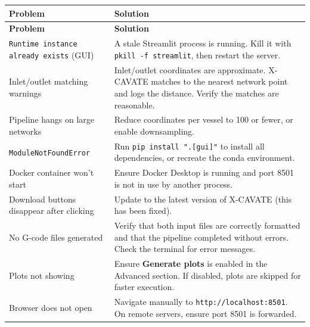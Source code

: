 \documentclass[11pt,letterpaper]{article}
\newcommand{\code}[1]{\texttt{#1}}
\newcommand{\gui}[1]{\textcolor{guicolor}{\textsf{\textbf{#1}}}}
\begin{document}
\begin{longtable}{L{4.5cm} X}
\toprule
\textbf{Problem} & \textbf{Solution} \\
\midrule
\endfirsthead
\toprule
\textbf{Problem} & \textbf{Solution} \\
\midrule
\endhead
\code{Runtime instance already exists} (GUI) &
A stale Streamlit process is running. Kill it with \code{pkill -f streamlit}, then restart the server. \\
\midrule
Inlet/outlet matching warnings &
Inlet/outlet coordinates are approximate. X-CAVATE matches to the nearest network point and logs the distance. Verify the matches are reasonable. \\
\midrule
Pipeline hangs on large networks &
Reduce coordinates per vessel to 100 or fewer, or enable downsampling. \\
\midrule
\code{ModuleNotFoundError} &
Run \code{pip install ".[gui]"} to install all dependencies, or recreate the conda environment. \\
\midrule
Docker container won't start &
Ensure Docker Desktop is running and port 8501 is not in use by another process. \\
\midrule
Download buttons disappear after clicking &
Update to the latest version of X-CAVATE (this has been fixed). \\
\midrule
No G-code files generated &
Verify that both input files are correctly formatted and that the pipeline completed without errors. Check the terminal for error messages. \\
\midrule
Plots not showing &
Ensure \gui{Generate plots} is enabled in the Advanced section. If disabled, plots are skipped for faster execution. \\
\midrule
Browser does not open &
Navigate manually to \code{http://localhost:8501}. On remote servers, ensure port 8501 is forwarded. \\
\bottomrule
\end{longtable}
\end{document}
